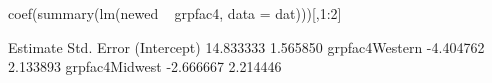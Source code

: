 \begin{Schunk}
\begin{Sinput}
  coef(summary(lm(newed ~ grpfac4, data = dat)))[,1:2]
\end{Sinput}
\begin{Soutput}
                Estimate Std. Error
(Intercept)    14.833333   1.565850
grpfac4Western -4.404762   2.133893
grpfac4Midwest -2.666667   2.214446
\end{Soutput}
\end{Schunk}
